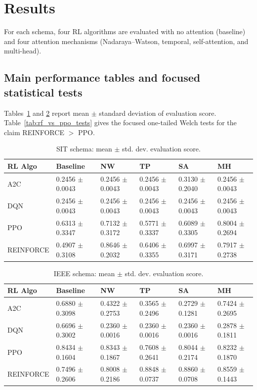 \documentclass[sn-basic]{sn-jnl}%
\begin{document}
\section{Results} \label{sec:results} %
For each schema, four RL algorithms are evaluated with no attention (baseline) and four attention mechanisms (Nadaraya--Watson, temporal, self-attention, and multi-head).

\subsection{Main performance tables and focused statistical tests}
\label{sec:hypothesis_tests}

Tables~\ref{tab:sit_main_results} and \ref{tab:ieee_main_results} report mean $\pm$ standard deviation of evaluation score. Table~\ref{tab:rf_vs_ppo_tests} gives the focused one-tailed Welch tests for the claim \textsc{REINFORCE} $>$ \textsc{PPO}.

\begin{table}[htbp]
	\centering
	\caption{SIT schema: mean $\pm$ std. dev. evaluation score.}
	\label{tab:sit_main_results}
	\begin{tabular}{l l l l l l}
	\toprule
	\textbf{RL Algo} & \textbf{Baseline} & \textbf{NW} & \textbf{TP} & \textbf{SA} & \textbf{MH}\\
	\midrule
	A2C & 0.2456 $\pm$ 0.0043 & 0.2456 $\pm$ 0.0043 & 0.2456 $\pm$ 0.0043 & 0.3130 $\pm$ 0.2040 & 0.2456 $\pm$ 0.0043\\
	DQN & 0.2456 $\pm$ 0.0043 & 0.2456 $\pm$ 0.0043 & 0.2456 $\pm$ 0.0043 & 0.2456 $\pm$ 0.0043 & 0.2456 $\pm$ 0.0043\\
	PPO & 0.6313 $\pm$ 0.3347 & 0.7132 $\pm$ 0.3172 & 0.5771 $\pm$ 0.3337 & 0.6089 $\pm$ 0.3305 & 0.8004 $\pm$ 0.2694\\
	REINFORCE & 0.4907 $\pm$ 0.3108 & 0.8646 $\pm$ 0.2032 & 0.6406 $\pm$ 0.3355 & 0.6997 $\pm$ 0.3171 & 0.7917 $\pm$ 0.2738\\
	\bottomrule
	\end{tabular}
\end{table}

\begin{table}[htbp]
	\centering
	\caption{IEEE schema: mean $\pm$ std. dev. evaluation score.}
	\label{tab:ieee_main_results}
	\begin{tabular}{l l l l l l}
	\toprule
	\textbf{RL Algo} & \textbf{Baseline} & \textbf{NW} & \textbf{TP} & \textbf{SA} & \textbf{MH}\\
	\midrule
	A2C & 0.6880 $\pm$ 0.3098 & 0.4322 $\pm$ 0.2753 & 0.3565 $\pm$ 0.2496 & 0.2729 $\pm$ 0.1281 & 0.7424 $\pm$ 0.2695\\
	DQN & 0.6696 $\pm$ 0.3002 & 0.2360 $\pm$ 0.0016 & 0.2360 $\pm$ 0.0016 & 0.2360 $\pm$ 0.0016 & 0.2878 $\pm$ 0.1811\\
	PPO & 0.8434 $\pm$ 0.1604 & 0.8343 $\pm$ 0.1867 & 0.7608 $\pm$ 0.2641 & 0.8044 $\pm$ 0.2174 & 0.8232 $\pm$ 0.1870\\
	REINFORCE & 0.7496 $\pm$ 0.2606 & 0.8008 $\pm$ 0.2186 & 0.8848 $\pm$ 0.0737 & 0.8860 $\pm$ 0.0708 & 0.8559 $\pm$ 0.1443\\
	\bottomrule
	\end{tabular}
\end{table}
\end{document}
